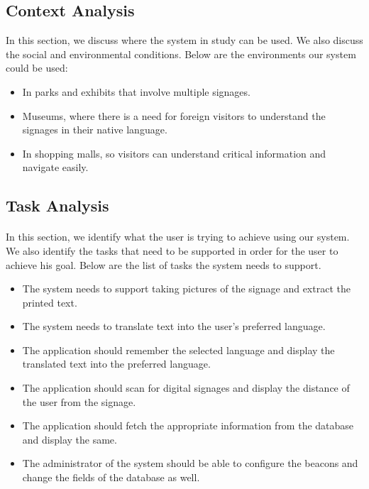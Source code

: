 \documentclass[12pt]{article}
\begin{document}
    \subsection{Context Analysis}
    
    In this section, we discuss where the system in study can be used. We also discuss the social and environmental conditions. Below are the environments our system could be used:
    
   
\begin{itemize}

 \item In parks and exhibits that involve multiple signages.
 
  \item Museums, where there is a need for foreign visitors to understand the signages in their native language.
 
  \item In shopping malls, so visitors can understand critical information and navigate easily.
  
  \end{itemize}
  

\subsection{Task Analysis}
\label{task}
\paragraph{}In this section, we identify what the user is trying to achieve using our system. We also identify the tasks that need to be supported in order for the user to achieve his goal. Below are the list of tasks the system needs to support. 

\begin{itemize}

 \item The system needs to support taking pictures of the signage and extract the printed text. 
 
  \item The system needs to translate text into the user's preferred language.
 
  \item The application should remember the selected language and display the translated text into the preferred language.
  
  \item The application should scan for digital signages and display the distance of the user from the signage.
  
    \item The application should fetch the appropriate information from the database and display the same.
    
    \item The administrator of the system should be able to configure the beacons and change the fields of the database as well.
    
    \end{itemize}
    
\end{document}
